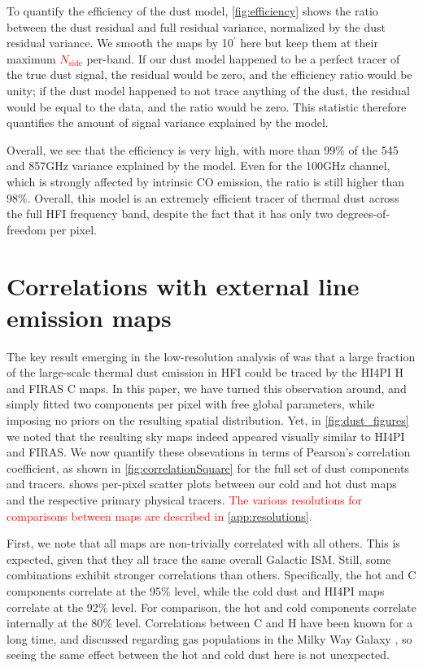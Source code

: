 \documentclass{aa}
\makeatletter
\DeclareRobustCommand{\ion}[2]{%
\relax\ifmmode
\ifx\testbx\f@series
{\mathbf{#1\,\mathsc{#2}}}\else
{\mathrm{#1\,\mathsc{#2}}}\fi
\else\textup{#1\,{\mdseries\textsc{#2}}}%
\fi}
\newcommand{\mathsc}[1]{{\normalfont\textsc{#1}}}
\def\nside{$N_{\mathrm{side}}$}
\def\,{\thinspace}
\newcommand{\edit}[1]{\textcolor{red}{#1}}
\makeatother
\begin{document}
To quantify the efficiency of the dust model, \cref{fig:efficiency} shows the ratio between the dust residual and full residual variance, normalized by the dust residual variance. We smooth the maps by 10$^\prime$ here but keep them at their maximum \edit{\nside} per-band. If our dust model happened to be a perfect tracer of the true dust signal, the residual would be zero, and the efficiency ratio would be unity; if the dust model happened to not trace anything of the dust, the residual would be equal to the data, and the ratio would be zero. This statistic therefore quantifies the amount of signal variance explained by the model.

Overall, we see that the efficiency is very high, with more than 99\,\% of the 545 and 857\,GHz variance explained by the model. Even for the 100\,GHz channel, which is strongly affected by intrinsic CO emission, the ratio is still higher than 98\,\%. Overall, this model is an extremely efficient tracer of thermal dust across the full HFI frequency band, despite the fact that it has only two degrees-of-freedom per pixel.  

\section{Correlations with external line emission maps}
\label{sec:correlations}

The key result emerging in the low-resolution analysis of \citet{CG02_05} was that a large fraction of the large-scale thermal dust emission in HFI could be traced by the HI4PI \ion{H}{i} and FIRAS \ion{C}{ii} maps. In this paper, we have turned this observation around, and simply fitted two components per pixel with free global parameters, while imposing no priors on the resulting spatial distribution. Yet, in \cref{fig:dust_figures} we noted that the resulting sky maps indeed appeared visually similar to HI4PI and FIRAS. We now quantify these obsevations in terms of Pearson's correlation coefficient, as shown in \cref{fig:correlationSquare} for the full set of dust components and tracers.  shows per-pixel scatter plots between our cold and hot dust maps and the respective primary physical tracers. \edit{The various resolutions for comparisons between maps are described in \cref{app:resolutions}.} 

First, we note that all maps are non-trivially correlated with all others. This is expected, given that they all trace the same overall Galactic ISM. Still, some combinations exhibit stronger correlations than others. Specifically, the hot and \ion{C}{ii} components correlate at the 95\% level, while the cold dust and HI4PI maps correlate at the 92\% level. For comparison, the hot and cold components correlate internally at the 80\% level. Correlations between \ion{C}{ii} and \ion{H}{i} have been known for a long time, and discussed regarding gas populations in the Milky Way Galaxy \citep{2014_CII,2010_CII,2013_CII}, so seeing the same effect between the hot and cold dust here is not unexpected.
\end{document}
